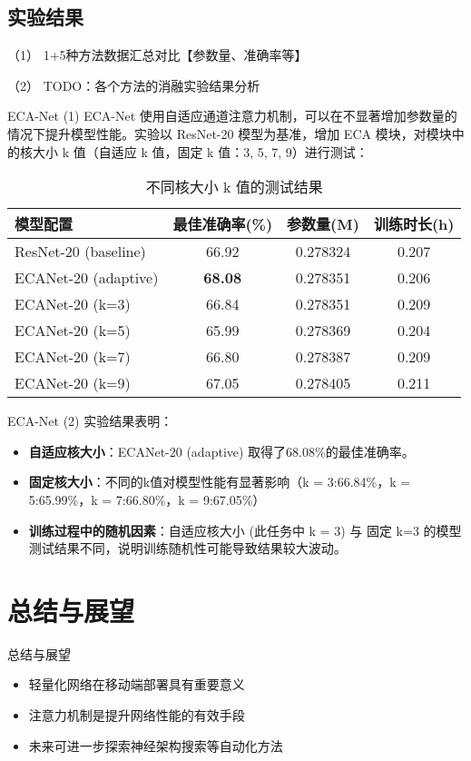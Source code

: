 \documentclass[10pt]{beamer}
\begin{document}
\subsection{实验结果}
 （1） 1+5种方法数据汇总对比【参数量、准确率等】


（2） TODO：各个方法的消融实验结果分析

\begin{frame}{ECA-Net (1)}
ECA-Net \cite{Wang_2020_CVPR} 使用自适应通道注意力机制，可以在不显著增加参数量的情况下提升模型性能。实验以 ResNet-20 模型为基准，增加 ECA 模块，对模块中的核大小 k 值（自适应 k 值，固定 k 值：3, 5, 7, 9）进行测试：
\begin{table}[h]
\centering
\begin{tabular}{lccc}
\hline
模型配置 & 最佳准确率(\%) & 参数量(M) & 训练时长(h) \\
\hline
ResNet-20 (baseline) & 66.92 & 0.278324 & 0.207 \\
ECANet-20 (adaptive) & \textbf{68.08} & 0.278351 & 0.206 \\
ECANet-20 (k=3) & 66.84 & 0.278351 & 0.209 \\
ECANet-20 (k=5) & 65.99 & 0.278369 & 0.204 \\
ECANet-20 (k=7) & 66.80 & 0.278387 & 0.209 \\
ECANet-20 (k=9) & 67.05 & 0.278405 & 0.211 \\
\hline
\end{tabular}
\caption{不同核大小 k 值的测试结果}
\end{table}
\end{frame}

\begin{frame}{ECA-Net (2)}
实验结果表明：
\begin{itemize}
\item \textbf{自适应核大小}：ECANet-20 (adaptive) 取得了68.08\%的最佳准确率。
\item \textbf{固定核大小}：不同的k值对模型性能有显著影响（k = 3:66.84\%，k = 5:65.99\%，k = 7:66.80\%，k = 9:67.05\%）
\item \textbf{训练过程中的随机因素}：自适应核大小 (此任务中 k = 3) 与 固定 k=3 的模型测试结果不同，说明训练随机性可能导致结果较大波动。
\end{itemize}

\end{frame}


\section{总结与展望}
\begin{frame}{总结与展望}
\begin{itemize}
\item 轻量化网络在移动端部署具有重要意义
\item 注意力机制是提升网络性能的有效手段
\item 未来可进一步探索神经架构搜索等自动化方法
\end{itemize}
\end{frame}
\end{document}

